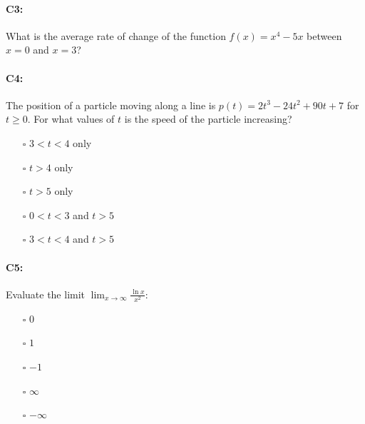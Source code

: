 \documentclass[pdftex, brazil, 12pt, twoside]{article}
\begin{document}
\begin{figure}[H]
  \begin{center}
    \label{fig:adv-c2}
  \end{center}
\end{figure}

\paragraph{C3:} What is the average rate of change of the function $f(x) = x^4 - 5x$ between $x=0$ and $x=3$?

\paragraph{C4:} The position of a particle moving along a line is $p(t) = 2t^3 -24 t^2 +90t + 7$ for $t \ge 0$.
For what values of $t$ is the speed of the particle increasing?

\begin{itemize}[noitemsep]
\item[$\square$] $3 < t < 4$ only
\item[$\square$] $t > 4$ only
\item[$\square$] $t > 5$ only
\item[$\square$] $0 < t < 3$ and $t > 5$
\item[$\square$] $3 < t < 4$ and $t > 5$
\end{itemize}

\paragraph{C5:} Evaluate the limit $\lim_{x \to \infty} \frac{\ln{x}}{x^2}$:

\begin{itemize}[noitemsep]
\item[$\square$] $0$
\item[$\square$] $1$
\item[$\square$] $-1$
\item[$\square$] $\infty$
\item[$\square$] $-\infty$
\end{itemize}
\end{document}
